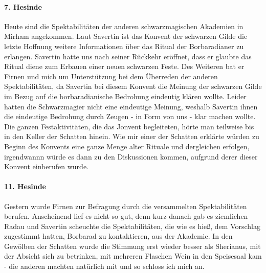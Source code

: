 \paragraph{7. Hesinde}
Heute sind die Spektabilitäten der anderen schwarzmagischen Akademien in Mirham angekommen. Laut Savertin ist das Konvent der schwarzen Gilde die letzte Hoffnung weitere Informationen über das Ritual der Borbaradianer zu erlangen. Savertin hatte uns nach seiner Rückkehr eröffnet, dass er glaubte das Ritual diene zum Erbauen einer neuen schwarzen Feste. Des Weiteren bat er Firnen und mich um Unterstützung bei dem Überreden der anderen Spektabilitäten, da Savertin bei diesem Konvent die Meinung der schwarzen Gilde im Bezug auf die borbaradianische Bedrohung eindeutig klären wollte. Leider hatten die Schwarzmagier nicht eine eindeutige Meinung, weshalb Savertin ihnen die eindeutige Bedrohung durch Zeugen - in Form von uns - klar machen wollte. Die ganzen Festaktivitäten, die das Jonvent begleiteten, hörte man teilweise bis in den Keller der Schatten hinein. Wie mir einer der Schatten erklärte würden zu Beginn des Konvents eine ganze Menge alter Rituale und dergleichen erfolgen, irgendwannn würde es dann zu den Diskussionen kommen, aufgrund derer dieser Konvent einberufen wurde.

\paragraph{11. Hesinde}
Gestern wurde Firnen zur Befragung durch die versammelten Spektabilitäten berufen. Anscheinend lief es nicht so gut, denn kurz danach gab es ziemlichen Radau und Savertin scheuchte die Spektabilitäten, die wie es hieß, dem Vorschlag zugestimmt hatten, Borbarad zu kontaktieren, aus der Akademie. In den Gewölben der Schatten wurde die Stimmung erst wieder besser als Sherianus, mit der Absicht sich zu betrinken, mit mehreren Flaschen Wein in den Speisesaal kam - die anderen machten natürlich mit und so schloss ich mich an.

